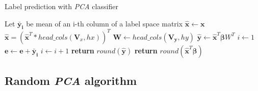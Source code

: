 \begin{algorithm}
    \caption{Label prediction with \textit{PCA} classifier}\label{alg:pca2}
    \begin{algorithmic}[1]
        \State Let $\boldsymbol{\bar{y}_i}$ be mean of an i-th column of a label space matrix
        \State $\boldsymbol{\hat{x}} \gets \boldsymbol{x}$
            \State $\boldsymbol{\hat{x}} = (\boldsymbol{\hat{x}}^T*head\_cols(\boldsymbol{V}_x, hx))^T$
        \EndIf
            \State $\boldsymbol{W} \gets head\_cols(\boldsymbol{V_y}, hy)$
            \State $\boldsymbol{\hat{y}} \gets \boldsymbol{\hat{x}}^T\boldsymbol{\beta}W^T$
            \State $i \gets 1$
            \State $\boldsymbol{e} \gets \boldsymbol{e} + \boldsymbol{\bar{y}_i}$
                \State $i \gets i+1$
            \EndFor
            \State \textbf{return} $round(\boldsymbol{\hat{y}})$
        \Else
            \State \textbf{return} $round(\boldsymbol{\hat{x}}^T\boldsymbol{\beta})$
        \EndIf
    \EndFunction
    
    \end{algorithmic}
\end{algorithm}

\subsection{Random \textit{PCA} algorithm}

